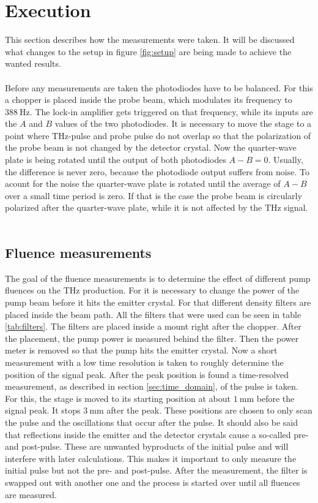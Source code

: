 \section{Execution}
\label{sec:execution}
This section describes how the measurements were taken. 
It will be discussed what changes to the setup in figure \ref{fig:setup} are being made to achieve the wanted results.
\\\\
Before any measurements are taken the photodiodes have to be balanced.
For this a chopper is placed inside the probe beam, which modulates its frequency to $\SI{388}{\hertz}$.
The lock-in amplifier gets triggered on that frequency, while its inputs are the $A$ and $B$ values of the two photodiodes.
It is necessary to move the stage to a point where $\si{\tera\hertz}$-pulse and probe pulse do not overlap so that the polarization of the probe beam is not changed by the detector crystal.
Now the quarter-wave plate is being rotated until the output of both photodiodes $A-B = 0$.
Usually, the difference is never zero, because the photodiode output suffers from noise.
To acount for the noise the quarter-wave plate is rotated until the average of $A-B$ over a small time period is zero.
If that is the case the probe beam is circularly polarized after the quarter-wave plate, while it is not affected by the $\si{\tera\hertz}$ signal.
\\\\

\subsection{Fluence measurements}
The goal of the fluence measurements is to determine the effect of different pump fluences on the $\si{\tera\hertz}$ production.
For it is necessary to change the power of the pump beam before it hits the emitter crystal.
For that different density filters are placed inside the beam path.
All the filters that were used can be seen in table \ref{tab:filters}.
The filters are placed inside a mount right after the chopper.
After the placement, the pump power is measured behind the filter.
Then the power meter is removed so that the pump hits the emitter crystal.
Now a short measurement with a low time resolution is taken to roughly determine the position of the signal peak.
After the peak position is found a time-resolved measurement, as described in section \ref{sec:time_domain}, of the pulse is taken.
For this, the stage is moved to its starting position at about $\SI{1}{\milli\meter}$ before the signal peak.
It stops $\SI{3}{\milli\meter}$ after the peak.
These positions are chosen to only scan the pulse and the oscillations that occur after the pulse.
It should also be said that reflections inside the emitter and the detector crystals cause a so-called pre- and post-pulse.
These are unwanted byproducts of the initial pulse and will interfere with later calculations.
This makes it important to only measure the initial pulse but not the pre- and post-pulse.
After the measurement, the filter is swapped out with another one and the process is started over until all fluences are measured.

